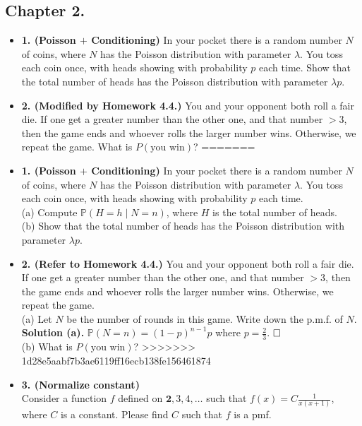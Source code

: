 \documentclass[12pt]{article}
\begin{document}
\subsection*{Chapter 2.}
\begin{itemize}
<<<<<<< HEAD
    \item \textbf{1. (Poisson $+$ Conditioning)} In your pocket there is a random number $N$ of coins, where $N$ has the Poisson distribution with parameter $\lambda$. You toss each coin once, with heads showing with probability $p$ each time. Show that the total number of heads has the Poisson distribution with parameter $\lambda p$. 
    \item \textbf{2. (Modified by Homework 4.4.)} You and your opponent both roll a fair die. If one get a greater number than the other one, and that number $>3$, then the game ends and whoever rolls the larger number wins. Otherwise, we repeat the game. What is $P(\text{you win})$? 
=======
    \item \textbf{1. (Poisson $+$ Conditioning)} In your pocket there is a random number $N$ of coins, where $N$ has the Poisson distribution with parameter $\lambda$. You toss each coin once, with heads showing with probability $p$ each time.\\
    (a) Compute $\mathbb{P}(H=h\mid N=n)$, where $H$ is the total number of heads. \\
    (b) Show that the total number of heads has the Poisson distribution with parameter $\lambda p$.
    \item \textbf{2. (Refer to Homework 4.4.)} You and your opponent both roll a fair die. If one get a greater number than the other one, and that number $>3$, then the game ends and whoever rolls the larger number wins. Otherwise, we repeat the game.\\
    (a) Let $N$ be the number of rounds in this game. Write down the p.m.f. of $N$. \\
    \textbf{Solution (a).} $\mathbb{P}(N=n)=(1-p)^{n-1}p$ where $p=\frac{2}{3}$.
    $\hspace{\fill}\square$\\
    (b) What is $P(\text{you win})$? 
>>>>>>> 1d28e5aabf7b3ae6119ff16ecb138fe156461874
    \item \textbf{3. (Normalize constant)}\\
Consider a function \(f\) defined on \(\textbf{2},3,4,\dots\) such that \(f(x) = C \frac{1}{x(x+1)}\), where \(C\) is a constant. Please find \(C\) such that \(f\) is a pmf. 


\end{itemize}
\end{document}
